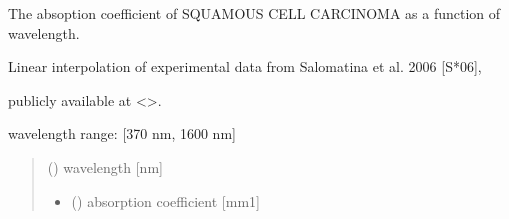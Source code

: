 \documentclass[letterpaper,10pt,english]{sphinxmanual}
\begin{document}
\begin{fulllineitems}
\label{\detokenize{03_absorption_coefficient:skinoptics.absorption_coefficient.mua_SCC_Salomatina}}
\pysigstartsignatures
{}
\pysigstopsignatures
\begin{DUlineblock}{0em}
\item[] The absoption coefficient of SQUAMOUS CELL CARCINOMA as a function of wavelength.
\item[] Linear interpolation of experimental data from Salomatina et al. 2006 {[}S*06{]},
\item[] publicly available at \textless{}\textgreater{}.
\end{DUlineblock}

\begin{DUlineblock}{0em}
\item[] wavelength range: {[}370 nm, 1600 nm{]}
\end{DUlineblock}
\begin{quote}\begin{description}
\sphinxAtStartPar
{} () \textendash{} wavelength {[}nm{]}

\sphinxAtStartPar
\begin{itemize}
\item {} 
\sphinxAtStartPar
{} () \textendash{} absorption coefficient {[}mm\sphinxhyphen{}1{]}

\end{itemize}


\end{description}\end{quote}

\end{fulllineitems}

\end{document}
